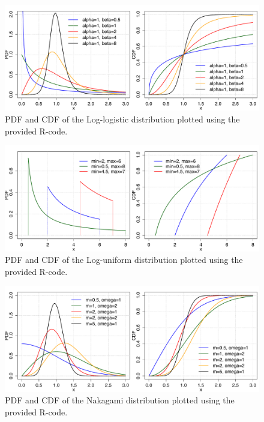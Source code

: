 \begin{figure}[htb!]
\centering
  \includegraphics[width=140mm]{pics/LogLogistic_pdf_cdf.pdf}
 \caption{PDF and CDF of the Log-logistic distribution plotted using the provided R-code.}
 \label{fig:LogLogistic_pdf_cdf}
\end{figure}

\begin{figure}[htb!]
\centering
  \includegraphics[width=140mm]{pics/LogUniform_pdf_cdf.pdf}
 \caption{PDF and CDF of the Log-uniform distribution plotted using the provided R-code.}
 \label{fig:LogUniform_pdf_cdf}
\end{figure}

\begin{figure}[htb!]
\centering
  \includegraphics[width=140mm]{pics/Nakagami_pdf_cdf.pdf}
 \caption{PDF and CDF of the Nakagami distribution plotted using the provided R-code.}
 \label{fig:Nakagami_pdf_cdf}
\end{figure}

